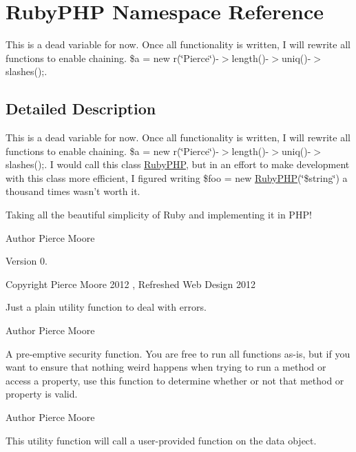 \hypertarget{namespace_ruby_p_h_p}{\section{Ruby\-P\-H\-P Namespace Reference}
\label{namespace_ruby_p_h_p}
}


This is a dead variable for now. Once all functionality is written, I will rewrite all functions to enable chaining. \$a = new r(\char`\"{}\-Pierce\char`\"{})-\/$>$length()-\/$>$uniq()-\/$>$slashes();.  




\subsection{Detailed Description}
This is a dead variable for now. Once all functionality is written, I will rewrite all functions to enable chaining. \$a = new r(\char`\"{}\-Pierce\char`\"{})-\/$>$length()-\/$>$uniq()-\/$>$slashes();. I would call this class \hyperlink{namespace_ruby_p_h_p}{Ruby\-P\-H\-P}, but in an effort to make development with this class more efficient, I figured writing \$foo = new \hyperlink{namespace_ruby_p_h_p}{Ruby\-P\-H\-P}(\char`\"{}\$string\char`\"{}) a thousand times wasn't worth it.

Taking all the beautiful simplicity of Ruby and implementing it in P\-H\-P! \begin{DoxyAuthor}{Author}
Pierce Moore 
\end{DoxyAuthor}
\begin{DoxyVersion}{Version}
0. 
\end{DoxyVersion}
\begin{DoxyCopyright}{Copyright}
Pierce Moore 2012 , Refreshed Web Design 2012
\end{DoxyCopyright}
Just a plain utility function to deal with errors.

\begin{DoxyAuthor}{Author}
Pierce Moore
\end{DoxyAuthor}
A pre-\/emptive security function. You are free to run all functions as-\/is, but if you want to ensure that nothing weird happens when trying to run a method or access a property, use this function to determine whether or not that method or property is valid.

\begin{DoxyAuthor}{Author}
Pierce Moore
\end{DoxyAuthor}
This utility function will call a user-\/provided function on the data object.

